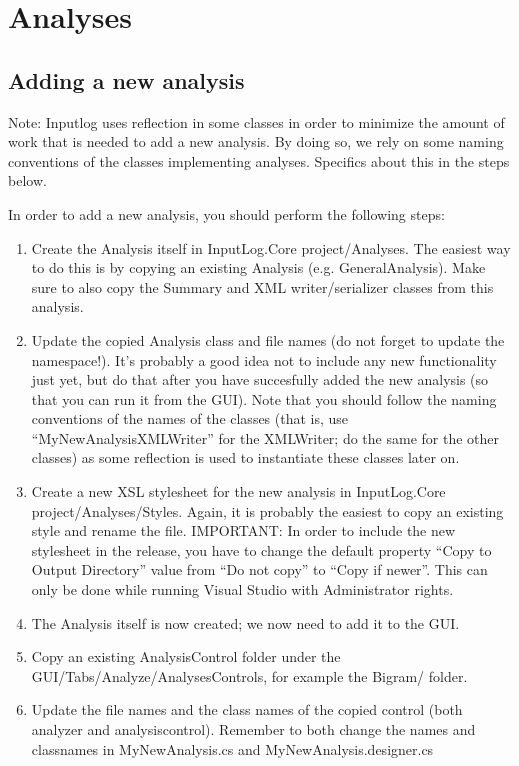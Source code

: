 \documentclass[a4paper,11pt]{report}
\begin{document}
\chapter{Analyses}
\section{Adding a new analysis}
Note: Inputlog uses reflection in some classes in order to minimize the amount of work that is needed to add a new analysis. By doing so, we rely on some naming conventions of the classes implementing analyses. Specifics about this in the steps below.

In order to add a new analysis, you should perform the following steps:
\begin{enumerate}
\item Create the Analysis itself in InputLog.Core project/Analyses. The easiest way to do this is by copying an existing Analysis (e.g. GeneralAnalysis). Make sure to also copy the Summary and XML writer/serializer classes from this analysis.
\item Update the copied Analysis class and file names (do not forget to update the namespace!). It's probably a good idea not to include any new functionality just yet, but do that after you have succesfully added the new analysis (so that you can run it from the GUI). Note that you should follow the naming conventions of the names of the classes (that is, use ``MyNewAnalysisXMLWriter'' for the XMLWriter; do the same for the other classes) as some reflection is used to instantiate these classes later on.
\item Create a new XSL stylesheet for the new analysis in InputLog.Core project/Analyses/Styles. Again, it is probably the easiest to copy an existing style and rename the file.
IMPORTANT: In order to include the new stylesheet in the release, you have to change the default property ``Copy to Output Directory'' value from ``Do not copy'' to ``Copy if newer''. This can only be done while running Visual Studio with Administrator rights.
\item The Analysis itself is now created; we now need to add it to the GUI.
\item Copy an existing AnalysisControl folder under the GUI/Tabs/Analyze/AnalysesControls, for example the Bigram/ folder.
\item Update the file names and the class names of the copied control (both analyzer and analysiscontrol). Remember to both change the names and classnames in MyNewAnalysis.cs and MyNewAnalysis.designer.cs

\end{enumerate}
\end{document}
